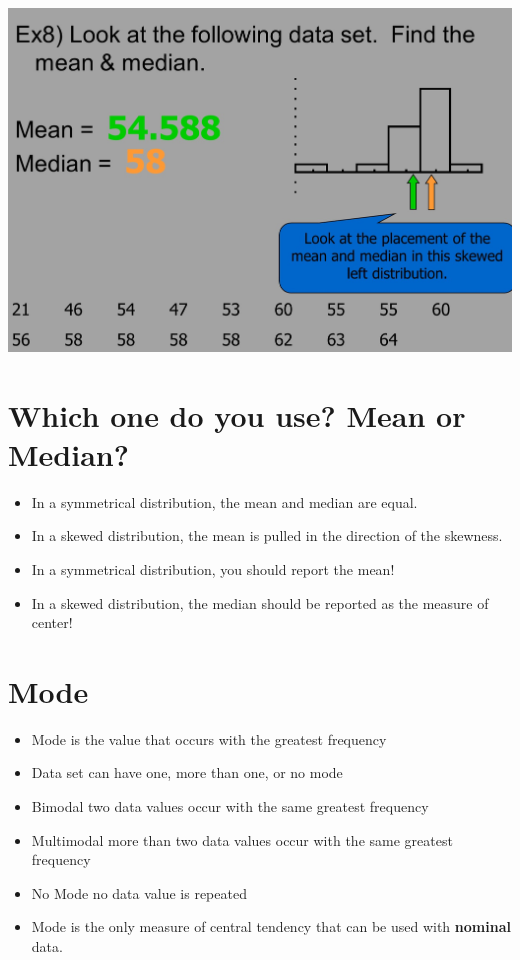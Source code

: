 \documentclass[]{book}
\providecommand{\tightlist}{%
  \setlength{\itemsep}{0pt}\setlength{\parskip}{0pt}}
\begin{document}
\includegraphics{pic7.jpg}

\hypertarget{which-one-do-you-use-mean-or-median-1}{%
\section{Which one do you use? Mean or Median?}\label{which-one-do-you-use-mean-or-median-1}}

\begin{itemize}
\tightlist
\item
  In a symmetrical distribution, the mean and median are equal.
\item
  In a skewed distribution, the mean is pulled in the direction of the skewness.
\item
  In a symmetrical distribution, you should report the mean!
\item
  In a skewed distribution, the median should be reported as the measure of center!
\end{itemize}

\hypertarget{mode}{%
\section{Mode}\label{mode}}

\begin{itemize}
\tightlist
\item
  Mode is the value that occurs with the greatest frequency
\item
  Data set can have one, more than one, or no mode
\item
  Bimodal two data values occur with the same greatest frequency
\item
  Multimodal more than two data values occur with the same greatest frequency
\item
  No Mode no data value is repeated
\item
  Mode is the only measure of central tendency that can be used with \textbf{nominal} data.
\end{itemize}
\end{document}
